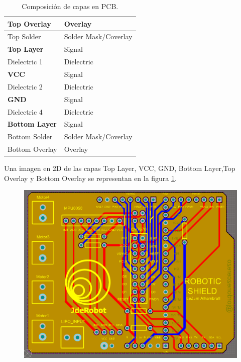 \renewcommand\tablename{Tabla}
\begin{table}[H]
	\centering
	
	\begin{tabular}{|l|l|}
		\hline
		Top Overlay           & Overlay              \\ \hline
		Top Solder            & Solder Mask/Coverlay \\ \hline
		\textbf{Top Layer}    & Signal               \\ \hline
		Dielectric 1          & Dielectric           \\ \hline
		\textbf{VCC}          & Signal               \\ \hline
		Dielectric 2          & Dielectric           \\ \hline
		\textbf{GND}          & Signal               \\ \hline
		Dielectric 4          & Dielectric           \\ \hline
		\textbf{Bottom Layer} & Signal               \\ \hline
		Bottom Solder         & Solder Mask/Coverlay \\ \hline
		Bottom Overlay        & Overlay              \\ \hline
	\end{tabular}
	\caption{Composición de capas en PCB.}
	\label{tabla:layers_altium}
\end{table}



Una imagen en 2D de las capas Top Layer, VCC, GND, Bottom Layer,Top Overlay y Bottom Overlay se representan en la figura \ref{fig:layers_altium}.


\begin{center}
	\begin{figure}[H]
		\center
		\includegraphics[scale=0.8, angle=90]{imagenes/Balancing_Robot/layers_altium.PNG}
		\caption{}
		\label{fig:layers_altium}
	\end{figure}
\end{center}


